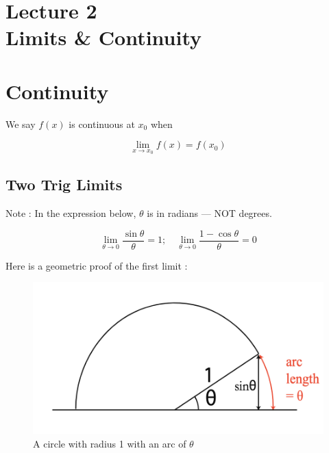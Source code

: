 

\section*{\centering Lecture 2 \\
\bigbreak 
Limits \& Continuity}

\bigbreak
\section{Continuity}

We say $f(x)$ is continuous at $x_0$ when

\begin{equation*}
\lim_{x \to x_0} f(x) = f(x_0)
\end{equation*}

\subsection*{Two Trig Limits}

Note : In the expression below, $\theta$ is in radians --- NOT degrees.

\begin{equation*}
\boxed{
	\lim_{\theta \to 0} \frac{\sin \theta}{\theta} = 1; \quad \lim_{\theta \to 0} \frac{1-\cos \theta}{\theta} = 0
}
\end{equation*}

Here is a geometric proof of the first limit : 

\begin{figure}[h]
	\centering
	\includegraphics[scale=0.7]{./images/lecture_2_figure_1.png}
	\caption{A circle with radius 1 with an arc of $\theta$}    
\end{figure}

